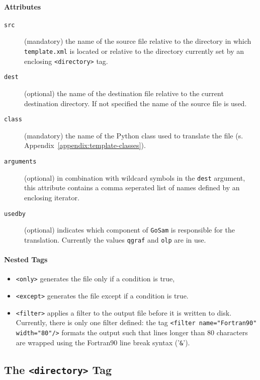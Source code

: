\documentclass[11pt,a4paper]{refrep}
\newcommand{\golem}{{\tt GoSam}\xspace}
\begin{document}
\paragraph{Attributes}
\begin{description}
\item[\texttt{src}] (mandatory) the name of the source file relative
   to the directory in which \texttt{template.xml} is located or
   relative to the directory currently set by an enclosing
   \texttt{<directory>} tag.
\item[\texttt{dest}] (optional) the name of the destination file
   relative to the current destination directory. If not specified
   the name of the source file is used.
\item[\texttt{class}]
   (mandatory) the name of the Python class
   used to translate the file (s. Appendix~\ref{appendix:template-classes}).
\item[\texttt{arguments}] (optional) in combination with wildcard symbols
   in the \texttt{dest} argument, this attribute contains a comma seperated
   list of names defined by an enclosing iterator.
\item[\texttt{usedby}] (optional) indicates which component of \golem{}
   is responsible for the translation. Currently the values \texttt{qgraf}
   and \texttt{olp} are in use.
\end{description}

\paragraph{Nested Tags}
\begin{itemize}
\item \texttt{<only>} generates the file only if a condition is true,
\item \texttt{<except>} generates the file except if a condition is true.
\item \texttt{<filter>} applies a filter to the output file before it is
   written to disk. Currently, there is only one filter defined:
   the tag \texttt{<filter name="Fortran90" width="80"/>} formats the
   output such that lines longer than 80 characters are wrapped using
   the Fortran90 line break syntax ('\texttt{\&}').
\end{itemize}

\subsection{The \texttt{<directory>} Tag}
\end{document}
